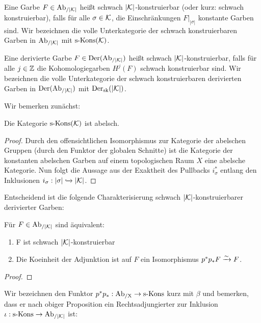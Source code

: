 
\begin{defn}
  Eine Garbe $F \in \operatorname{Ab}_{/|\mathcal{K}|}$ heißt schwach $|\mathcal{K}|$-konstruierbar (oder
  kurz: schwach konstruierbar), falls für alle $\sigma \in \mathcal{K}$, die
  Einschränkungen $F|_{|\sigma|}$ konstante Garben sind. Wir
  bezeichnen die volle Unterkategorie der schwach konstruierbaren
  Garben in $\operatorname{Ab}_{/|\mathcal{K}|}$ mit $\operatorname{s-Kons}(\mathcal{K})$.

  Eine derivierte Garbe $F \in \operatorname{Der}(\operatorname{Ab}_{/|\mathcal{K}|})$ heißt schwach
  $|\mathcal{K}|$-konstruierbar, falls für alle $j \in \mathbb{Z}$ die
  Kohomologiegarben $H^j(F)$ schwach konstruierbar sind. Wir
  bezeichnen die volle Unterkategorie der schwach konstruierbaren
  derivierten Garben in $\operatorname{Der}(\operatorname{Ab}_{/|\mathcal{K}|})$ mit $\operatorname{Der}_{\mathrm{sk}}(|\mathcal{K}|)$.
\end{defn}

Wir bemerken zunächst:

\begin{lemma}
  Die Kategorie $\operatorname{s-Kons}(\mathcal{K})$ ist abelsch.
\end{lemma}
\begin{proof}
  Durch den offensichtlichen Isomorphismus zur Kategorie der abelschen
  Gruppen (durch den Funktor der globalen Schnitte) ist die Kategorie
  der konstanten abelschen Garben auf einem topologischen Raum $X$
  eine abelsche Kategorie. Nun folgt die Aussage aus der Exaktheit des
  Pullbacks $i_{\sigma}^*$ entlang den Inklusionen $i_{\sigma}:
  |\sigma| \xhookrightarrow{} |\mathcal{K}|$.
\end{proof}

Entscheidend ist die folgende Charakterisierung schwach
$|\mathcal{K}|$-konstruierbarer derivierter Garben:

\begin{prop}
  Für $F \in \operatorname{Ab}_{/|\mathcal{K}|}$ sind äquivalent:
  \begin{enumerate}
  \item F ist schwach $|\mathcal{K}|$-konstruierbar
  \item Die Koeinheit der Adjunktion ist auf $F$ ein Isomorphismus
    $p^*p_*F \xrightarrow{\sim} F$.
  \end{enumerate}
\end{prop}
\begin{proof}
\end{proof}

Wir bezeichnen den Funktor $p^*p_*: \operatorname{Ab_{/X}} \to \operatorname{s-Kons}$ kurz mit $\beta$
und bemerken, dass er nach obiger Proposition ein Rechtsadjungierter
zur Inklusion $\iota: \operatorname{s-Kons} \to \operatorname{Ab}_{/|\mathcal{K}|}$ ist:


